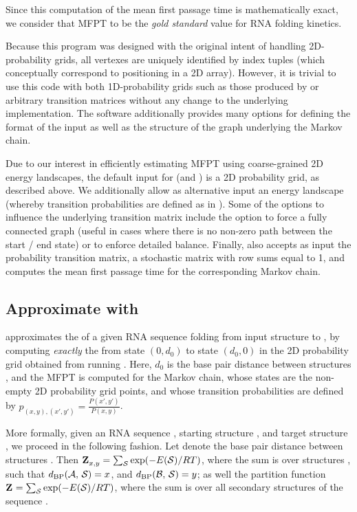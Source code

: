 Since this computation of the
mean first passage time is mathematically exact, we consider that MFPT
to be the {\em gold standard} value for RNA folding kinetics.

Because this program was designed with the original intent
of handling 2D-probability grids, all vertexes are uniquely identified
by index tuples (which conceptually correspond to positioning in a 2D
array). However, it is trivial to use this code with both
1D-probability grids such as those produced by \fftbor
\citep{senter.po12} or arbitrary transition matrices without any change
to the underlying implementation. The software additionally provides
many options for defining the format of the input as well as the
structure of the graph underlying the
Markov chain.

Due to our interest in efficiently estimating MFPT using coarse-grained 2D
energy landscapes, the default input for \rnamfpt (and \rnaeq) is a 2D
probability grid, as described above. We additionally allow as alternative input
an energy landscape (whereby transition probabilities are defined as in
).
Some of the options to influence the underlying transition matrix
include the option to force a fully
connected graph (useful in cases where there is no non-zero path
between the start / end state) or to enforce detailed balance.
Finally, \rnamfpt also accepts as input the probability transition matrix,
a stochastic matrix with row sums equal to 1, and computes the mean
first passage time for the corresponding Markov chain.

\subsection{Approximate \mfpt with \fftmfpt}
\label{subsec:hermes:fftmfpt}

\fftmfpt approximates the \mfpt of a given RNA
sequence folding from input structure \strA to \strB, by
computing {\em exactly} the \mfpt from state $(0,d_0)$ to state
$(d_0,0)$ in the 2D probability grid obtained from running
\ffttwo. Here, $d_0$ is the base pair distance between structures
\strAB, and the MFPT is computed for the Markov chain, whose states are
the non-empty 2D probability grid points, and whose transition
probabilities are defined by $p_{(x,y),(x',y')} =
\frac{P(x',y')}{P(x,y)}$.

More formally, given an RNA sequence \seq, starting structure \strA, and
target structure \strB, we proceed in the following fashion. Let \dBP{\strA}{\strB} denote the base pair distance between structures
\strAB. Then ${\bf Z}^{}_{x,y} = \sum_\mathcal S \exp(-E(\mathcal S)/RT)$, where the sum is over
structures \str, such that $d_{\text{BP}}(\mathcal A,\,\mathcal S) = x$, and
$d_{\text{BP}}(\mathcal B,\,\mathcal S) = y$; as
well the partition function ${\bf Z}^{}_{} = \sum_\mathcal S \exp(-E(\mathcal S)/RT)$, where the sum
is over all secondary structures \str of the sequence \seq.

